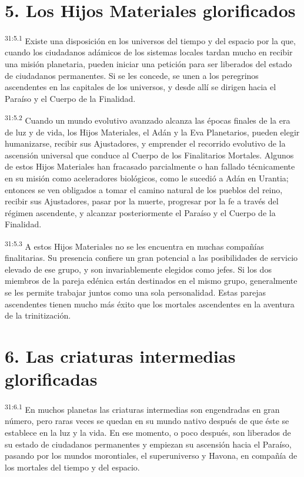 \section*{5. Los Hijos Materiales glorificados}
\par
\textsuperscript{31:5.1} Existe una disposición en los universos del tiempo y del espacio por la que, cuando los ciudadanos adámicos de los sistemas locales tardan mucho en recibir una misión planetaria, pueden iniciar una petición para ser liberados del estado de ciudadanos permanentes. Si se les concede, se unen a los peregrinos ascendentes en las capitales de los universos, y desde allí se dirigen hacia el Paraíso y el Cuerpo de la Finalidad.

\par
\textsuperscript{31:5.2} Cuando un mundo evolutivo avanzado alcanza las épocas finales de la era de luz y de vida, los Hijos Materiales, el Adán y la Eva Planetarios, pueden elegir humanizarse, recibir sus Ajustadores, y emprender el recorrido evolutivo de la ascensión universal que conduce al Cuerpo de los Finalitarios Mortales. Algunos de estos Hijos Materiales han fracasado parcialmente o han fallado técnicamente en su misión como aceleradores biológicos, como le sucedió a Adán en Urantia; entonces se ven obligados a tomar el camino natural de los pueblos del reino, recibir sus Ajustadores, pasar por la muerte, progresar por la fe a través del régimen ascendente, y alcanzar posteriormente el Paraíso y el Cuerpo de la Finalidad.

\par
\textsuperscript{31:5.3} A estos Hijos Materiales no se les encuentra en muchas compañías finalitarias. Su presencia confiere un gran potencial a las posibilidades de servicio elevado de ese grupo, y son invariablemente elegidos como jefes. Si los dos miembros de la pareja edénica están destinados en el mismo grupo, generalmente se les permite trabajar juntos como una sola personalidad. Estas parejas ascendentes tienen mucho más éxito que los mortales ascendentes en la aventura de la trinitización.

\section*{6. Las criaturas intermedias glorificadas}
\par
\textsuperscript{31:6.1} En muchos planetas las criaturas intermedias son engendradas en gran número, pero raras veces se quedan en su mundo nativo después de que éste se establece en la luz y la vida. En ese momento, o poco después, son liberados de su estado de ciudadanos permanentes y empiezan su ascensión hacia el Paraíso, pasando por los mundos morontiales, el superuniverso y Havona, en compañía de los mortales del tiempo y del espacio.

